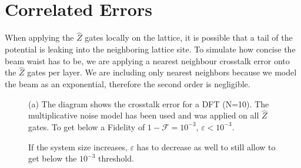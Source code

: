 \section{Correlated Errors}
When applying the $\widehat{Z}$ gates locally on the lattice, it is possible that a tail of the potential is leaking into the neighboring lattice site. To simulate how concise the beam waist has to be, we are applying a nearest neighbour crosstalk error onto the $\widehat{Z}$ gates per layer. We are including only nearest neighbors because we model the beam as an exponential, therefore the second order is negligible. 
\begin{figure}[t]
  \centering
  \caption[Correlated Crosstalk Error Model vs $\varepsilon$ for DFT]{(a) The diagram shows the crosstalk error for a DFT (N=10). The multiplicative noise model has been used and was applied on all $\widehat{Z}$ gates. To get below a Fidelity of $1-\mathcal{F} = 10^{-3}$, $\varepsilon < 10^{-3}$.}
  \label{fig:addnoise}
\end{figure}

\begin{figure}[t]
  \centering
  \caption[Correlated Crosstalk Error Model vs N for DFT]{If the system size increases, $\varepsilon$ has to decrease as well to still allow to get below the $10^{-3}$ threshold.}
  \label{fig:addnoise}
\end{figure}

